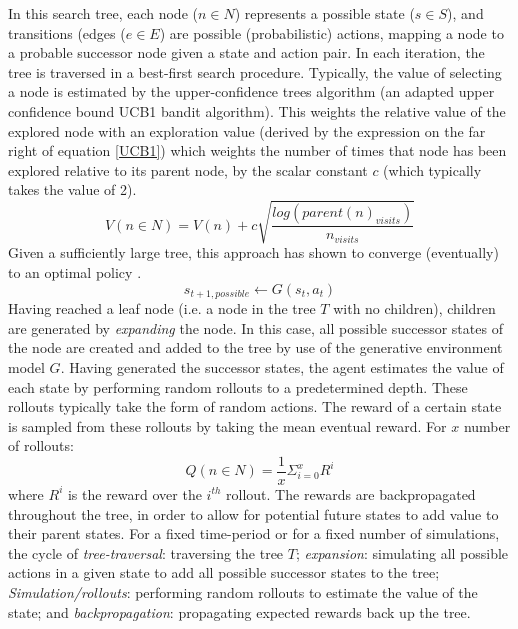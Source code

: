 In this search tree, each node ($n \in N$) represents a possible state ($s \in S$), and transitions (edges ($e \in E$) are possible (probabilistic) actions, mapping a node to a probable successor node given a state and action pair. 
\newline \newline
In each iteration, the tree is traversed in a best-first search procedure. Typically, the value of selecting a node is estimated by the upper-confidence trees algorithm (an adapted upper confidence bound UCB1 bandit algorithm). This weights the relative value of the explored node with an exploration value (derived by the expression on the far right of equation \ref{UCB1}) which weights the number of times that node has been explored relative to its parent node, by the scalar constant $c$ (which typically takes the value of 2).
\begin{equation}\label{UCB1}
    V(n \in N) = V(n) + c \sqrt{\frac{log(parent(n)_{visits})}{n_{visits}}} 
\end{equation}
Given a sufficiently large tree, this approach has shown to converge (eventually) to an optimal policy \cite{Ross2011}. 
\begin{equation}
    s_{t+1, possible} \leftarrow G(s_t, a_t)
\end{equation}
Having reached a leaf node (i.e. a node in the tree $T$ with no children), children are generated by \textit{expanding} the node. In this case, all possible successor states of the node are created and added to the tree by use of the generative environment model $G$. 
\newline \newline
Having generated the successor states, the agent estimates the value of each state by performing random rollouts to a predetermined depth. These rollouts typically take the form of random actions. The reward of a certain state is sampled from these rollouts by taking the mean eventual reward. For $x$ number of rollouts:
\begin{equation}
    Q(n \in N) = \frac{1}{x}\Sigma_{i=0}^x R^i
\end{equation} 
where $R^i$ is the reward over the $i^{th}$ rollout.
\newline\newline
The rewards are backpropagated throughout the tree, in order to allow for potential future states to add value to their parent states.
\newline \newline
For a fixed time-period or for a fixed number of simulations, the cycle of \textit{tree-traversal}: traversing the tree $T$; \textit{expansion}: simulating all possible actions in a given state to add all possible successor states to the tree; \textit{Simulation/rollouts}: performing random rollouts to estimate the value of the state; and \textit{backpropagation}: propagating expected rewards back up the tree. 
